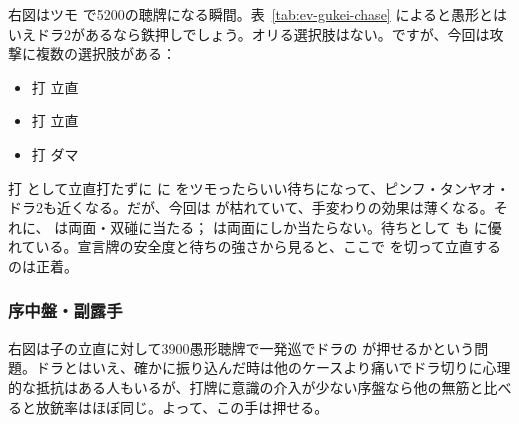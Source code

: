 \documentclass[../nankiru_main.tex]{subfiles}
\begin{document}
\begin{minipage}[t]{\textwidth}
  \begin{figure}\vspace{-1.5\topskip}
  \end{figure}
  
  右図はツモ  で5200の聴牌になる瞬間。表~\ref{tab:ev-gukei-chase} によると愚形とはいえドラ2があるなら鉄押しでしょう。オリる選択肢はない。ですが、今回は攻撃に複数の選択肢がある：
  
  \begin{itemize}
  \item 打  立直
  \item 打  立直
  \item 打  ダマ
  \end{itemize}
  
  打  として立直打たずに  に  をツモったらいい待ちになって、ピンフ・タンヤオ・ドラ2も近くなる。だが、今回は  が枯れていて、手変わりの効果は薄くなる。それに、 は両面・双碰に当たる； は両面にしか当たらない。待ちとして  も  に優れている。宣言牌の安全度と待ちの強さから見ると、ここで  を切って立直するのは正着\citep[][pp.~154--157]{doi}。
\end{minipage}

\subsubsection{序中盤・副露手}

\begin{minipage}[t][6.5cm]{\textwidth}
  \begin{figure}\vspace{-1.5\topskip}
  \end{figure}
  
  右図は子の立直に対して3900愚形聴牌で一発巡でドラの  が押せるかという問題。ドラとはいえ、確かに振り込んだ時は他のケースより痛いでドラ切りに心理的な抵抗はある人もいるが、打牌に意識の介入が少ない序盤なら他の無筋と比べると放銃率はほぼ同じ。よって、この手は押せる\citep[][pp.~178--179]{fkt}。
\end{minipage}
\end{document}
